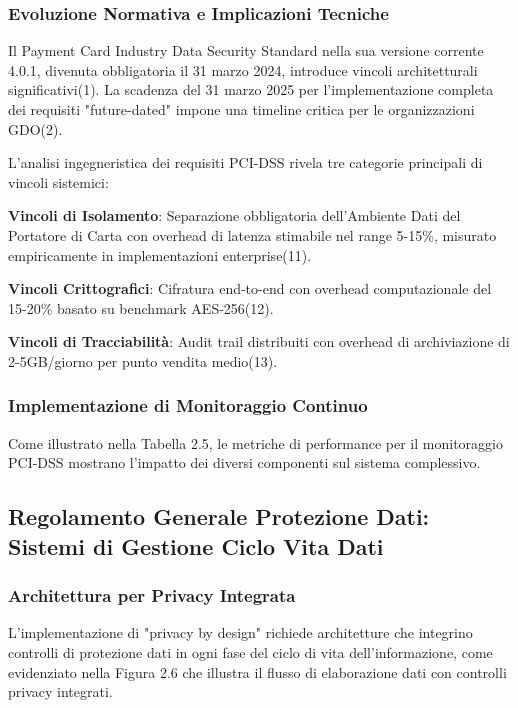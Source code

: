 \documentclass[12pt,a4paper,oneside]{book}
\begin{document}
\subsubsection{Evoluzione Normativa e Implicazioni Tecniche}

Il Payment Card Industry Data Security Standard nella sua versione corrente 4.0.1, divenuta obbligatoria il 31 marzo 2024, introduce vincoli architetturali significativi(1). La scadenza del 31 marzo 2025 per l'implementazione completa dei requisiti "future-dated" impone una timeline critica per le organizzazioni GDO(2).

L'analisi ingegneristica dei requisiti PCI-DSS rivela tre categorie principali di vincoli sistemici:

\textbf{Vincoli di Isolamento}: Separazione obbligatoria dell'Ambiente Dati del Portatore di Carta con overhead di latenza stimabile nel range 5-15\%, misurato empiricamente in implementazioni enterprise(11).

\textbf{Vincoli Crittografici}: Cifratura end-to-end con overhead computazionale del 15-20\% basato su benchmark AES-256(12).

\textbf{Vincoli di Tracciabilità}: Audit trail distribuiti con overhead di archiviazione di 2-5GB/giorno per punto vendita medio(13).

\subsubsection{Implementazione di Monitoraggio Continuo}

Come illustrato nella Tabella 2.5, le metriche di performance per il monitoraggio PCI-DSS mostrano l'impatto dei diversi componenti sul sistema complessivo.

\subsection{Regolamento Generale Protezione Dati: Sistemi di Gestione Ciclo Vita Dati}

\subsubsection{Architettura per Privacy Integrata}

L'implementazione di "privacy by design" richiede architetture che integrino controlli di protezione dati in ogni fase del ciclo di vita dell'informazione, come evidenziato nella Figura 2.6 che illustra il flusso di elaborazione dati con controlli privacy integrati.
\end{document}
